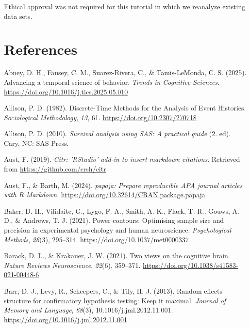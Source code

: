 \documentclass[
  english,
  man, donotrepeattitle,floatsintext]{apa6}
\newlength{\cslhangindent}
\newenvironment{CSLReferences}[2] %
 {\begin{list}{}{%
  \setlength{\itemindent}{0pt}
  \setlength{\leftmargin}{0pt}
  \setlength{\parsep}{0pt}
  \ifodd #1
   \setlength{\leftmargin}{\cslhangindent}
   \setlength{\itemindent}{-1\cslhangindent}
  \fi
  \setlength{\itemsep}{#2\baselineskip}}}
 {\end{list}}
\begin{document}
Ethical approval was not required for this tutorial in which we reanalyze existing data sets.

\newpage

\section{References}\label{references}

\label{refs}
\begin{CSLReferences}{1}{0}
Abney, D. H., Fausey, C. M., Suarez-Rivera, C., \& Tamis-LeMonda, C. S. (2025). Advancing a temporal science of behavior. \emph{Trends in Cognitive Sciences}. \url{https://doi.org/10.1016/j.tics.2025.05.010}

Allison, P. D. (1982). Discrete-{Time Methods} for the {Analysis} of {Event Histories}. \emph{Sociological Methodology}, \emph{13}, 61. \url{https://doi.org/10.2307/270718}

Allison, P. D. (2010). \emph{Survival analysis using {SAS}: A practical guide} (2. ed). Cary, NC: SAS Press.

Aust, F. (2019). \emph{Citr: 'RStudio' add-in to insert markdown citations}. Retrieved from \url{https://github.com/crsh/citr}

Aust, F., \& Barth, M. (2024). \emph{{papaja}: {Prepare} reproducible {APA} journal articles with {R Markdown}}. \url{https://doi.org/10.32614/CRAN.package.papaja}

Baker, D. H., Vilidaite, G., Lygo, F. A., Smith, A. K., Flack, T. R., Gouws, A. D., \& Andrews, T. J. (2021). Power contours: {Optimising} sample size and precision in experimental psychology and human neuroscience. \emph{Psychological Methods}, \emph{26}(3), 295--314. \url{https://doi.org/10.1037/met0000337}

Barack, D. L., \& Krakauer, J. W. (2021). Two views on the cognitive brain. \emph{Nature Reviews Neuroscience}, \emph{22}(6), 359--371. \url{https://doi.org/10.1038/s41583-021-00448-6}

Barr, D. J., Levy, R., Scheepers, C., \& Tily, H. J. (2013). Random effects structure for confirmatory hypothesis testing: {Keep} it maximal. \emph{Journal of Memory and Language}, \emph{68}(3), 10.1016/j.jml.2012.11.001. \url{https://doi.org/10.1016/j.jml.2012.11.001}


\end{CSLReferences}
\end{document}
